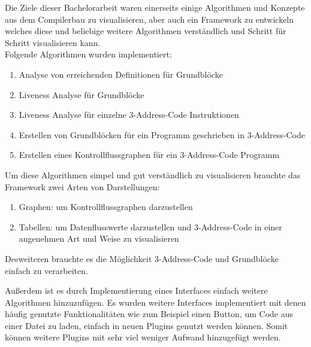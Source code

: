 Die Ziele dieser Bachelorarbeit waren
einerseits einige Algorithmen und Konzepte
aus dem Compilerbau zu visualisieren, 
aber auch ein Framework zu entwickeln welches
diese und beliebige weitere Algorithmen verständlich
und Schritt für Schritt visualisieren kann.\\

Folgende Algorithmen wurden implementiert:
\begin{enumerate}
  \item Analyse von erreichenden Definitionen für Grundblöcke 
  \item Liveness Analyse für Grundblöcke 
  \item Liveness Analyse für einzelne 3-Address-Code Instruktionen
  \item Erstellen von Grundblöcken für ein Programm geschrieben in 3-Address-Code
  \item Erstellen eines Kontrollflussgraphen für ein 3-Address-Code Programm
\end{enumerate}

Um diese Algorithmen simpel und gut verständlich zu visualisieren 
brauchte das Framework zwei Arten von Darstellungen:
\begin{enumerate}
  \item Graphen: um Kontrollflussgraphen darzustellen
  \item Tabellen: um Datenflusswerte darzustellen
    und 3-Address-Code in einer angenehmen Art und Weise zu visualisieren
\end{enumerate}
Desweiteren brauchte es die Möglichkeit 3-Address-Code
und Grundblöcke einfach zu verarbeiten.


Außerdem ist es durch Implementierung eines Interfaces einfach 
weitere Algorithmen hinzuzufügen.
Es wurden weitere Interfaces implementiert mit 
denen häufig genutzte Funktionalitäten wie zum Beispiel 
einen Button, um Code aus einer Datei zu laden, einfach in neuen
Plugins genutzt werden können. Somit können weitere Plugins
mit sehr viel weniger Aufwand hinzugefügt werden.
